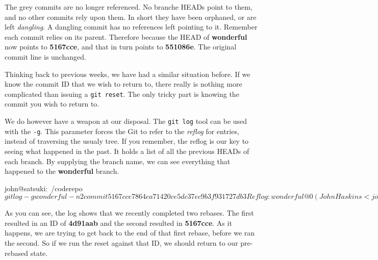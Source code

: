 
The grey commits are no longer referenced.
No branche HEADs point to them, and no other commits rely upon them.
In short they have been orphaned, or are left \emph{dangling}.
A dangling commit has no references left pointing to it.
Remember each commit relies on its parent.
Therefore because the HEAD of \textbf{wonderful} now points to \textbf{5167cce}, and that in turn points to \textbf{551086e}.
The original commit line is unchanged.

Thinking back to previous weeks, we have had a similar situation before.
If we know the commit ID that we wish to return to, there really is nothing more complicated than issuing a \texttt{git reset}.
The only tricky part is knowing the commit you wish to return to.

We do however have a weapon at our disposal.
The \texttt{git log} tool can be used with the \texttt{-g}.
This parameter forces the Git to refer to the \emph{reflog} for entries, instead of traversing the usualy tree.
If you remember, the reflog is our key to seeing what happened in the past.
It holds a list of all the previous HEADs of each branch.
By supplying the branch name, we can see everything that happened to the \textbf{wonderful} branch.

\begin{code}
john@satsuki:~/coderepo$ git log -g wonderful -n2
commit 5167cce7864ca71420ce5dc37ec9b3f931727db3
Reflog: wonderful@{0} (John Haskins <john.haskins@tamagoyakiinc.koala>)
Reflog message: rebase finished: refs/heads/wonderful onto f8d5100142b43ffaba9bb
Author: John Haskins <john.haskins@tamagoyakiinc.koala>
Date:   Wed Jul 6 09:30:40 2011 +0100

    Updated another file again

commit 4d91aab57aaad020e62486805e25d0d6f06fdc3e
Reflog: wonderful@{1} (John Haskins <john.haskins@tamagoyakiinc.koala>)
Reflog message: rebase -i (finish): refs/heads/wonderful onto 1c3206a
Author: John Haskins <john.haskins@tamagoyakiinc.koala>
Date:   Wed Jul 6 09:30:40 2011 +0100

    Updated another file again
john@satsuki:~/coderepo$
\end{code}

As you can see, the log shows that we recently completed two rebases.
The first resulted in an ID of \textbf{4d91aab} and the second resulted in \textbf{5167cce}.
As it happens, we are trying to get back to the end of that first rebase, before we ran the second.
So if we run the reset against that ID, we should return to our pre-rebased state.

